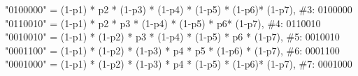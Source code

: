 \documentclass[
  letterpaper,
  DIV=11,
  numbers=noendperiod]{scrartcl}
\newenvironment{Shaded}{\begin{snugshade}}{\end{snugshade}}
\newcommand{\CommentTok}[1]{\textcolor[rgb]{0.37,0.37,0.37}{#1}}
\newcommand{\DecValTok}[1]{\textcolor[rgb]{0.68,0.00,0.00}{#1}}
\newcommand{\NormalTok}[1]{\textcolor[rgb]{0.00,0.23,0.31}{#1}}
\newcommand{\OtherTok}[1]{\textcolor[rgb]{0.00,0.23,0.31}{#1}}
\newcommand{\SpecialCharTok}[1]{\textcolor[rgb]{0.37,0.37,0.37}{#1}}
\newcommand{\StringTok}[1]{\textcolor[rgb]{0.13,0.47,0.30}{#1}}
\begin{document}
\begin{Shaded}
\begin{Highlighting}[]
          \StringTok{"0100000"} \OtherTok{=}\NormalTok{ (}\DecValTok{1}\SpecialCharTok{{-}}\NormalTok{p1) }\SpecialCharTok{*}\NormalTok{ p2 }\SpecialCharTok{*}\NormalTok{ (}\DecValTok{1}\SpecialCharTok{{-}}\NormalTok{p3) }\SpecialCharTok{*}\NormalTok{ (}\DecValTok{1}\SpecialCharTok{{-}}\NormalTok{p4) }\SpecialCharTok{*}\NormalTok{ (}\DecValTok{1}\SpecialCharTok{{-}}\NormalTok{p5) }\SpecialCharTok{*}\NormalTok{ (}\DecValTok{1}\SpecialCharTok{{-}}\NormalTok{p6)}\SpecialCharTok{*}\NormalTok{ (}\DecValTok{1}\SpecialCharTok{{-}}\NormalTok{p7),    }\CommentTok{\#3: 0100000}
          \StringTok{"0110010"} \OtherTok{=}\NormalTok{ (}\DecValTok{1}\SpecialCharTok{{-}}\NormalTok{p1) }\SpecialCharTok{*}\NormalTok{ p2 }\SpecialCharTok{*}\NormalTok{ p3 }\SpecialCharTok{*}\NormalTok{ (}\DecValTok{1}\SpecialCharTok{{-}}\NormalTok{p4) }\SpecialCharTok{*}\NormalTok{ (}\DecValTok{1}\SpecialCharTok{{-}}\NormalTok{p5) }\SpecialCharTok{*}\NormalTok{ p6}\SpecialCharTok{*}\NormalTok{ (}\DecValTok{1}\SpecialCharTok{{-}}\NormalTok{p7),            }\CommentTok{\#4: 0110010}
          \StringTok{"0010010"} \OtherTok{=}\NormalTok{ (}\DecValTok{1}\SpecialCharTok{{-}}\NormalTok{p1) }\SpecialCharTok{*}\NormalTok{ (}\DecValTok{1}\SpecialCharTok{{-}}\NormalTok{p2) }\SpecialCharTok{*}\NormalTok{ p3 }\SpecialCharTok{*}\NormalTok{ (}\DecValTok{1}\SpecialCharTok{{-}}\NormalTok{p4) }\SpecialCharTok{*}\NormalTok{ (}\DecValTok{1}\SpecialCharTok{{-}}\NormalTok{p5) }\SpecialCharTok{*}\NormalTok{ p6 }\SpecialCharTok{*}\NormalTok{ (}\DecValTok{1}\SpecialCharTok{{-}}\NormalTok{p7),       }\CommentTok{\#5: 0010010}
          \StringTok{"0001100"} \OtherTok{=}\NormalTok{ (}\DecValTok{1}\SpecialCharTok{{-}}\NormalTok{p1) }\SpecialCharTok{*}\NormalTok{ (}\DecValTok{1}\SpecialCharTok{{-}}\NormalTok{p2) }\SpecialCharTok{*}\NormalTok{ (}\DecValTok{1}\SpecialCharTok{{-}}\NormalTok{p3) }\SpecialCharTok{*}\NormalTok{ p4 }\SpecialCharTok{*}\NormalTok{ p5 }\SpecialCharTok{*}\NormalTok{ (}\DecValTok{1}\SpecialCharTok{{-}}\NormalTok{p6) }\SpecialCharTok{*}\NormalTok{ (}\DecValTok{1}\SpecialCharTok{{-}}\NormalTok{p7),       }\CommentTok{\#6: 0001100}
          \StringTok{"0001000"} \OtherTok{=}\NormalTok{ (}\DecValTok{1}\SpecialCharTok{{-}}\NormalTok{p1) }\SpecialCharTok{*}\NormalTok{ (}\DecValTok{1}\SpecialCharTok{{-}}\NormalTok{p2) }\SpecialCharTok{*}\NormalTok{ (}\DecValTok{1}\SpecialCharTok{{-}}\NormalTok{p3) }\SpecialCharTok{*}\NormalTok{ p4 }\SpecialCharTok{*}\NormalTok{ (}\DecValTok{1}\SpecialCharTok{{-}}\NormalTok{p5) }\SpecialCharTok{*}\NormalTok{ (}\DecValTok{1}\SpecialCharTok{{-}}\NormalTok{p6)}\SpecialCharTok{*}\NormalTok{ (}\DecValTok{1}\SpecialCharTok{{-}}\NormalTok{p7),    }\CommentTok{\#7: 0001000}

\end{Highlighting}
\end{Shaded}
\end{document}

